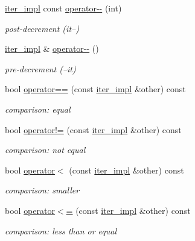\begin{DoxyCompactItemize}
\mbox{\hyperlink{classnlohmann_1_1detail_1_1iter__impl}{iter\+\_\+impl}} const \mbox{\hyperlink{classnlohmann_1_1detail_1_1iter__impl_a1fc43e764467b8ea4a4cdd01f629d757}{operator-\/-\/}} (int)
\begin{DoxyCompactList}\small\item\em post-\/decrement (it--) \end{DoxyCompactList}\item 
\mbox{\hyperlink{classnlohmann_1_1detail_1_1iter__impl}{iter\+\_\+impl}} \& \mbox{\hyperlink{classnlohmann_1_1detail_1_1iter__impl_a84e689fb581d651d130039f7cb81494a}{operator-\/-\/}} ()
\begin{DoxyCompactList}\small\item\em pre-\/decrement (--it) \end{DoxyCompactList}\item 
bool \mbox{\hyperlink{classnlohmann_1_1detail_1_1iter__impl_a2b592605b63ae7f5401996ffa3b14393}{operator==}} (const \mbox{\hyperlink{classnlohmann_1_1detail_1_1iter__impl}{iter\+\_\+impl}} \&other) const
\begin{DoxyCompactList}\small\item\em comparison\+: equal \end{DoxyCompactList}\item 
bool \mbox{\hyperlink{classnlohmann_1_1detail_1_1iter__impl_aeab0e2b5da70b3bdebecd5b1a6ee66a6}{operator!=}} (const \mbox{\hyperlink{classnlohmann_1_1detail_1_1iter__impl}{iter\+\_\+impl}} \&other) const
\begin{DoxyCompactList}\small\item\em comparison\+: not equal \end{DoxyCompactList}\item 
bool \mbox{\hyperlink{classnlohmann_1_1detail_1_1iter__impl_a0d14cd76203e00bdcef6a64a5d055cc7}{operator$<$}} (const \mbox{\hyperlink{classnlohmann_1_1detail_1_1iter__impl}{iter\+\_\+impl}} \&other) const
\begin{DoxyCompactList}\small\item\em comparison\+: smaller \end{DoxyCompactList}\item 
bool \mbox{\hyperlink{classnlohmann_1_1detail_1_1iter__impl_ac6f71b36d7c87e427d1fee83f2600fad}{operator$<$=}} (const \mbox{\hyperlink{classnlohmann_1_1detail_1_1iter__impl}{iter\+\_\+impl}} \&other) const
\begin{DoxyCompactList}\small\item\em comparison\+: less than or equal \end{DoxyCompactList}\item 

\end{DoxyCompactItemize}
